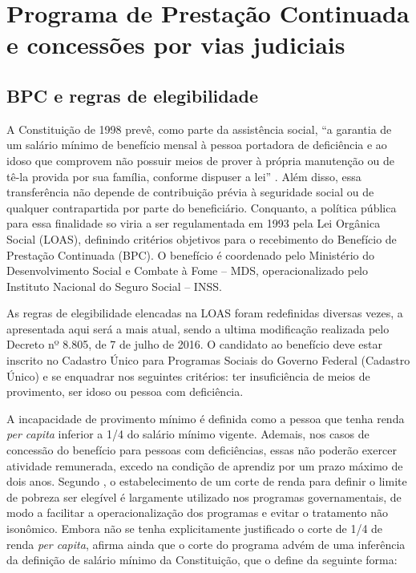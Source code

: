 \documentclass[
	12pt,				%
	openright,			%
	twoside,			%
	a4paper,			%
	english,			%
	french,				%
	spanish,			%
	brazil				%
	]{abntex2}
\begin{document}


\chapter{Programa de Prestação Continuada e concessões por vias judiciais}

	\section{BPC e regras de elegibilidade }
A Constituição de 1998 prevê, como parte da assistência social, ``a garantia de um salário mínimo de benefício mensal à pessoa portadora de deficiência e ao idoso que comprovem não possuir meios de prover à própria manutenção ou de tê-la provida por sua família, conforme dispuser a lei'' \cite[Art. 203, inciso V]{brasil1988}. Além disso, essa transferência não depende de contribuição prévia à seguridade social ou de qualquer contrapartida por parte do beneficiário. Conquanto, a política pública para essa finalidade so viria a ser regulamentada em 1993 pela Lei Orgânica Social (LOAS), definindo critérios objetivos para o recebimento do Benefício de Prestação Continuada (BPC). O benefício é coordenado pelo Ministério do Desenvolvimento Social e Combate à Fome -- MDS, operacionalizado pelo Instituto Nacional do Seguro Social -- INSS.


As regras de elegibilidade elencadas na LOAS foram redefinidas diversas vezes, a apresentada aqui será a mais atual, sendo a ultima modificação realizada pelo Decreto nº 8.805, de 7 de julho de 2016. O candidato ao benefício deve estar inscrito no Cadastro Único para Programas Sociais do Governo Federal (Cadastro Único) e se enquadrar nos seguintes critérios: ter insuficiência de meios de provimento, ser idoso ou pessoa com deficiência.
		
		 A incapacidade de provimento mínimo é definida como a pessoa que tenha renda \textit{per capita} inferior a 1/4 do salário mínimo vigente. Ademais, nos casos de concessão do benefício para pessoas com deficiências, essas não poderão exercer atividade remunerada, excedo na condição de aprendiz por um prazo máximo de dois anos. Segundo , o estabelecimento de um corte de renda para definir o limite de pobreza ser elegível é largamente utilizado nos programas governamentais, de modo a facilitar a operacionalização dos programas e evitar o tratamento não isonômico. Embora não se tenha explicitamente justificado o corte de 1/4 de renda \textit{per capita},  afirma ainda que o corte do programa advém de uma inferência da definição de salário mínimo da Constituição, que o define da seguinte forma:
		 
\end{document}
